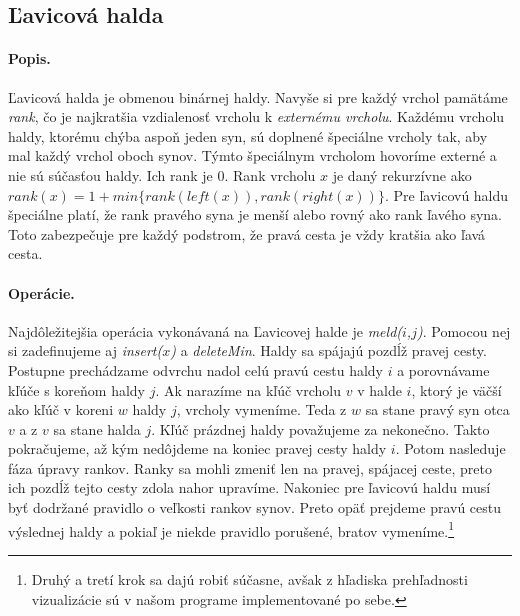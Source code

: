 \subsection{Ľavicová halda} 
\paragraph{Popis.}
Ľavicová halda je obmenou binárnej haldy. Navyše si pre každý vrchol pamätáme \emph{rank}, čo je najkratšia 
vzdialenosť vrcholu k \emph{externému vrcholu}. Každému vrcholu haldy, ktorému chýba aspoň jeden syn, sú 
doplnené špeciálne vrcholy tak, aby mal každý vrchol oboch synov. Týmto špeciálnym vrcholom hovoríme externé 
a nie sú súčasťou haldy. Ich rank je $0$. Rank vrcholu $x$ je daný rekurzívne ako $rank(x) 
= 1 + min\{rank(left(x)), rank(right(x)) \}$. Pre ľavicovú haldu špeciálne platí, že rank pravého syna je menší 
alebo rovný ako rank ľavého syna. Toto zabezpečuje pre každý podstrom, že pravá cesta je vždy kratšia 
ako ľavá cesta.

\paragraph{Operácie.}
Najdôležitejšia operácia vykonávaná na Ľavicovej halde je \emph{meld($i$,$j$)}. Pomocou nej si zadefinujeme aj \emph{insert($x$)} a 
\emph{deleteMin}. Haldy sa spájajú pozdĺž pravej cesty. Postupne prechádzame odvrchu nadol celú pravú cestu haldy $i$ a 
porovnávame kľúče s koreňom haldy $j$. Ak narazíme na kľúč vrcholu $v$ v halde $i$, ktorý je väčší ako kľúč v koreni 
$w$ haldy $j$, vrcholy vymeníme. Teda z $w$ sa stane pravý syn otca $v$ a z $v$ sa stane halda $j$. Kľúč prázdnej 
haldy považujeme za nekonečno. Takto pokračujeme, až kým nedôjdeme na koniec pravej cesty haldy $i$.
Potom nasleduje fáza úpravy rankov. Ranky sa mohli zmeniť len na pravej, spájacej ceste, preto ich pozdĺž tejto cesty 
zdola nahor upravíme.
Nakoniec pre ľavicovú haldu musí byť dodržané pravidlo o veľkosti rankov synov. Preto opäť prejdeme pravú cestu 
výslednej haldy a pokiaľ je niekde pravidlo porušené, bratov vymeníme.\footnote{Druhý a tretí krok sa dajú robiť 
súčasne, avšak z hľadiska prehľadnosti vizualizácie sú v našom programe implementované po sebe.}

